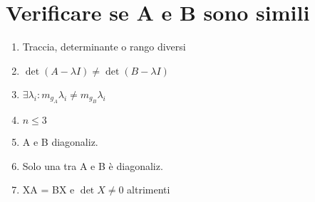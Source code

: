 \section{Verificare se A e B sono simili}
\begin{enumerate}[noitemsep]
	\item Traccia, determinante o rango diversi \Frowny{}
	\item $\det(A-\lambda I) \ne \det(B-\lambda I)$ \Frowny{}
	\item $\exists \lambda_i: m_{g_A} \lambda_i \ne m_{g_B} \lambda_i$ \Frowny{}
	\item $n \le 3$ \Smiley{}
	\item A e B diagonaliz. \Smiley{}
	\item Solo una tra A e B è diagonaliz. \Frowny{}
	\item XA = BX e $\det X \ne 0$ \Smiley{} altrimenti \Frowny
\end{enumerate}

